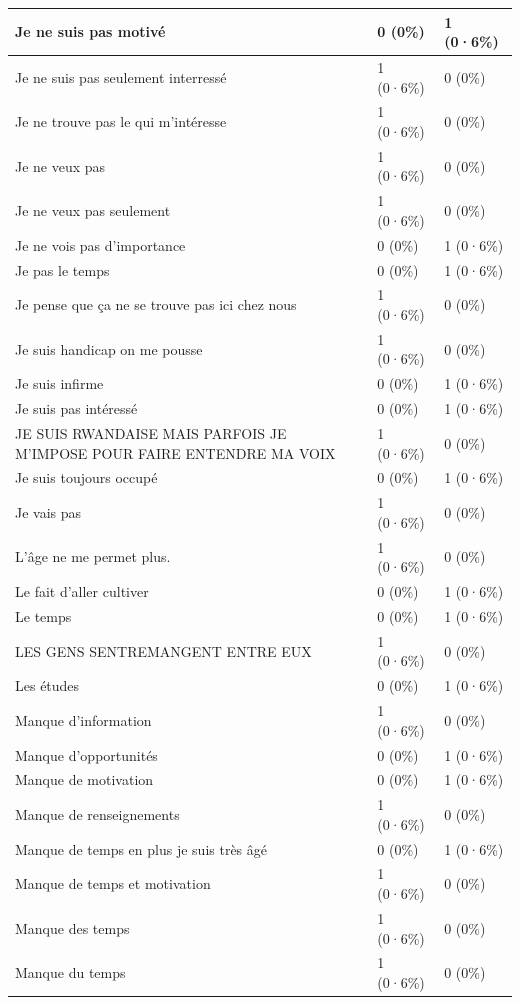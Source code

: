 \documentclass[
]{book}
\begin{document}
\begin{tabular}{l|l|l}
\hline
Je ne suis pas motivé & 0 (0\%) & 1 (0·6\%)\\
\hline
Je ne suis pas seulement interressé & 1 (0·6\%) & 0 (0\%)\\
\hline
Je ne trouve pas le qui m'intéresse & 1 (0·6\%) & 0 (0\%)\\
\hline
Je ne veux pas & 1 (0·6\%) & 0 (0\%)\\
\hline
Je ne veux pas seulement & 1 (0·6\%) & 0 (0\%)\\
\hline
Je ne vois pas d'importance & 0 (0\%) & 1 (0·6\%)\\
\hline
Je pas le temps & 0 (0\%) & 1 (0·6\%)\\
\hline
Je pense que ça ne se trouve pas ici chez nous & 1 (0·6\%) & 0 (0\%)\\
\hline
Je suis handicap on me pousse & 1 (0·6\%) & 0 (0\%)\\
\hline
Je suis infirme & 0 (0\%) & 1 (0·6\%)\\
\hline
Je suis pas intéressé & 0 (0\%) & 1 (0·6\%)\\
\hline
JE SUIS RWANDAISE MAIS PARFOIS JE M'IMPOSE POUR FAIRE ENTENDRE MA VOIX & 1 (0·6\%) & 0 (0\%)\\
\hline
Je suis toujours occupé & 0 (0\%) & 1 (0·6\%)\\
\hline
Je vais pas & 1 (0·6\%) & 0 (0\%)\\
\hline
L'âge ne me permet plus. & 1 (0·6\%) & 0 (0\%)\\
\hline
Le fait d'aller cultiver & 0 (0\%) & 1 (0·6\%)\\
\hline
Le temps & 0 (0\%) & 1 (0·6\%)\\
\hline
LES  GENS SENTREMANGENT ENTRE EUX & 1 (0·6\%) & 0 (0\%)\\
\hline
Les études & 0 (0\%) & 1 (0·6\%)\\
\hline
Manque d'information & 1 (0·6\%) & 0 (0\%)\\
\hline
Manque d'opportunités & 0 (0\%) & 1 (0·6\%)\\
\hline
Manque de motivation & 0 (0\%) & 1 (0·6\%)\\
\hline
Manque de renseignements & 1 (0·6\%) & 0 (0\%)\\
\hline
Manque de temps en plus je suis très âgé & 0 (0\%) & 1 (0·6\%)\\
\hline
Manque de temps et motivation & 1 (0·6\%) & 0 (0\%)\\
\hline
Manque des temps & 1 (0·6\%) & 0 (0\%)\\
\hline
Manque du temps & 1 (0·6\%) & 0 (0\%)\\

\end{tabular}
\end{document}

